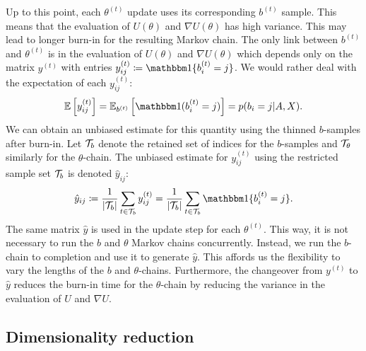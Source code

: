 Up to this point, each $\theta^{(t)}$ update uses its corresponding $b^{(t)}$ sample. This means that the evaluation of $U(\theta)$ and $\nabla U(\theta)$ has high variance. This may lead to longer burn-in for the resulting Markov chain. The only link between $b^{(t)}$ and $\theta^{(t)}$ is in the evaluation of $U(\theta)$ and $\nabla U(\theta)$ which depends only on the matrix $y^{(t)}$ with entries $y_{ij}^{(t)} \coloneqq \one\{b_i^{(t)} = j\}$. We would rather deal with the expectation of each $y_{ij}^{(t)}$:
%
\begin{equation}
	\Expect \left[ y_{ij}^{(t)} \right] = \Expect_{b^{(t)}} \left[ \one(b_{i}^{(t)} = j) \right]
	= p(b_i = j | A, X).
\end{equation}
%
We can obtain an unbiased estimate for this quantity using 
the thinned $b$-samples after burn-in.
Let $\mathcal{T}_b$  denote the retained set of indices 
for the $b$-samples and $\mathcal{T}_\theta$ similarly for the $\theta$-chain. 
The unbiased estimate for $y_{ij}^{(t)}$ using the 
restricted sample set $\mathcal{T}_b$ is denoted $\hat{y}_{ij}$:
%
\begin{equation}
	\hat{y}_{ij} \coloneqq \frac{1}{|\Tcal_b|} \sum_{t \in \Tcal_b} y_{ij}^{(t)} = \frac{1}{|\Tcal_b|} \sum_{t \in \Tcal_b} \one\{b_i^{(t)} = j\}.
	\label{eqn:y-hat}
\end{equation}
%
The same matrix $\hat{y}$ is used in the update step
for each $\theta^{(t)}$.
This way, it is not necessary to run the $b$ and $\theta$ Markov chains 
concurrently. Instead, we run the $b$-chain to completion and use it 
to generate $\hat{y}$. This affords us the flexibility to vary the 
lengths of the $b$ and $\theta$-chains. Furthermore, the changeover 
from $y^{(t)}$ to $\hat{y}$ reduces the burn-in time for 
the $\theta$-chain by reducing the variance in the evaluation 
of $U$ and $\nabla U$.

\subsection{Dimensionality reduction}
\label{sec:dim-reduction}

